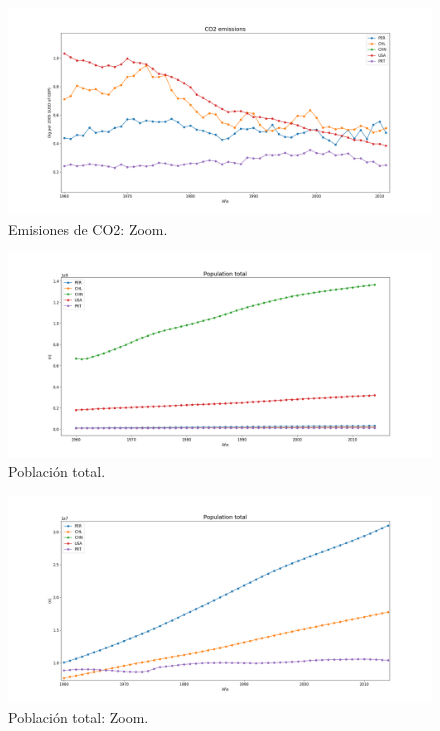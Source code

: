 \documentclass{article}
\begin{document}
\begin{figure}
	\centering
	\includegraphics[scale=0.38]{images/zoom - co2.png}
	\caption{Emisiones de CO2: Zoom.}
	\label{fig:11}
\end{figure}

\begin{figure}
	\centering
	\includegraphics[scale=0.38]{images/populationtotal.png}
	\caption{Población total.}
	\label{fig:12}
\end{figure}

\begin{figure}
	\centering
	\includegraphics[scale=0.38]{images/pt-zoom.png}
	\caption{Población total: Zoom.}
	\label{fig:13}
\end{figure}
\end{document}
